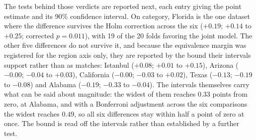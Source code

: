 The tests behind those verdicts are reported next, each entry giving the point estimate and its
90\% confidence interval. On category, Florida is the one dataset where the difference survives the
Holm correction across the six ($+0.19$; $+0.14$ to $+0.25$; corrected $p=0.011$), with 19 of the
20 folds favoring the joint model. The other five differences do not survive it, and because the
equivalence margin was registered for the region axis only, they are reported by the bound their intervals support
rather than as matches: Istanbul ($+0.08$; $+0.01$ to $+0.15$), Arizona ($-0.00$; $-0.04$ to
$+0.03$), California ($-0.00$; $-0.03$ to $+0.02$), Texas ($-0.13$; $-0.19$ to $-0.08$) and Alabama
($-0.19$; $-0.33$ to $-0.04$). %
The intervals themselves carry what can be said about magnitude:
the widest of them reaches $0.33$ points from zero, at Alabama, and with a Bonferroni adjustment
across the six comparisons the widest reaches $0.49$, so all six differences stay within half a point
of zero at once.
The bound is read off the intervals rather than established by a
further test.

